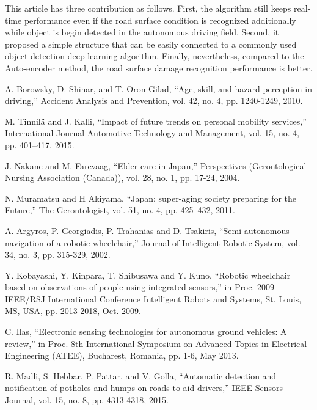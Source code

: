 \documentclass{ieeeaccess}
\begin{document}
This article has three contribution as follows. First, the algorithm still keeps real-time performance even if the road surface condition is recognized additionally while object is begin detected in the autonomous driving field. Second, it proposed a simple structure that can be easily connected to a commonly used object detection deep learning algorithm. Finally, nevertheless, compared to the Auto-encoder method, the road surface damage recognition performance is better.











\begin{thebibliography}{00}

 A. Borowsky, D. Shinar, and T. Oron-Gilad, ``Age, skill, and hazard perception in driving,'' Accident Analysis and Prevention, vol. 42, no. 4, pp. 1240-1249, 2010.

  M. Tinnilä and J. Kalli, ``Impact of future trends on personal mobility services,'' International Journal Automotive Technology and Management, vol. 15, no. 4, pp. 401–417, 2015.

 J. Nakane and M. Farevaag, ``Elder care in Japan,'' Perspectives (Gerontological Nursing Association (Canada)), vol. 28, no. 1, pp. 17-24, 2004.

 N. Muramatsu and H Akiyama, ``Japan: super-aging society preparing for the Future,'' The Gerontologist, vol. 51, no. 4, pp. 425–432, 2011.

 A. Argyros, P. Georgiadis, P. Trahanias and D. Tsakiris, ``Semi-autonomous navigation of a robotic wheelchair,'' Journal of Intelligent Robotic System, vol. 34, no. 3, pp. 315-329, 2002.

 Y. Kobayashi, Y. Kinpara, T. Shibusawa and Y. Kuno, ``Robotic wheelchair based on observations of people using integrated sensors,'' in Proc. 2009 IEEE/RSJ International Conference Intelligent Robots and Systems, St. Louis, MS, USA, pp. 2013-2018, Oct. 2009.

 C. Ilas, ``Electronic sensing technologies for autonomous ground vehicles: A review,'' in Proc. 8th International Symposium on Advanced Topics in Electrical Engineering (ATEE), Bucharest, Romania, pp. 1-6, May 2013.

 R. Madli, S. Hebbar, P. Pattar, and V. Golla, ``Automatic detection and notification of potholes and humps on roads to aid drivers,'' IEEE Sensors Journal, vol. 15, no. 8, pp. 4313-4318, 2015.


\end{thebibliography}
\end{document}
